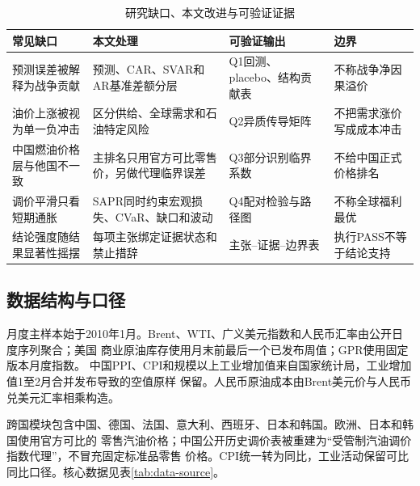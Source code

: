 \begin{table}[htbp]
  \centering
  \small
  \caption{研究缺口、本文改进与可验证证据}
  \label{tab:innovation-matrix}
  \begin{tabularx}{0.98\textwidth}{p{}p{}p{}X}
    \toprule
    常见缺口 & 本文处理 & 可验证输出 & 边界 \\
    \midrule
    预测误差被解释为战争贡献 & 预测、CAR、SVAR和AR基准差额分层 & Q1回测、placebo、结构贡献表 & 不称战争净因果溢价 \\
    油价上涨被视为单一负冲击 & 区分供给、全球需求和石油特定风险 & Q2异质传导矩阵 & 不把需求涨价写成成本冲击 \\
    中国燃油价格层与他国不一致 & 主排名只用官方可比零售价，另做代理临界误差 & Q3部分识别临界系数 & 不给中国正式价格排名 \\
    调价平滑只看短期通胀 & SAPR同时约束宏观损失、CVaR、缺口和波动 & Q4配对检验与路径图 & 不称全球福利最优 \\
    结论强度随结果显著性摇摆 & 每项主张绑定证据状态和禁止措辞 & 主张--证据--边界表 & 执行PASS不等于结论支持 \\
    \bottomrule
  \end{tabularx}
\end{table}

\subsection{数据结构与口径}

月度主样本始于2010年1月。Brent、WTI、广义美元指数和人民币汇率由公开日度序列聚合；美国
商业原油库存使用月末前最后一个已发布周值；GPR使用固定版本月度指数\cite{caldara2022}。
中国PPI、CPI和规模以上工业增加值来自国家统计局，工业增加值1至2月合并发布导致的空值原样
保留。人民币原油成本由Brent美元价与人民币兑美元汇率相乘构造。

跨国模块包含中国、德国、法国、意大利、西班牙、日本和韩国。欧洲、日本和韩国使用官方可比的
零售汽油价格；中国公开历史调价表被重建为“受管制汽油调价指数代理”，不冒充固定标准品零售
价格。CPI统一转为同比，工业活动保留可比同比口径。核心数据见表\ref{tab:data-source}。

